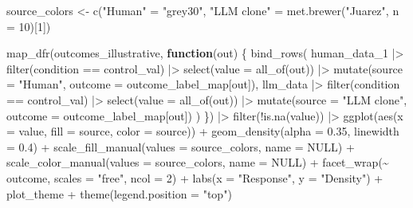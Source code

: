 \documentclass[
  letterpaper,
  DIV=11,
  numbers=noendperiod]{scrartcl}
\newenvironment{Shaded}{\begin{snugshade}}{\end{snugshade}}
\newcommand{\AttributeTok}[1]{\textcolor[rgb]{0.40,0.45,0.13}{#1}}
\newcommand{\ConstantTok}[1]{\textcolor[rgb]{0.56,0.35,0.01}{#1}}
\newcommand{\ControlFlowTok}[1]{\textcolor[rgb]{0.00,0.23,0.31}{\textbf{#1}}}
\newcommand{\DecValTok}[1]{\textcolor[rgb]{0.68,0.00,0.00}{#1}}
\newcommand{\FloatTok}[1]{\textcolor[rgb]{0.68,0.00,0.00}{#1}}
\newcommand{\FunctionTok}[1]{\textcolor[rgb]{0.28,0.35,0.67}{#1}}
\newcommand{\NormalTok}[1]{\textcolor[rgb]{0.00,0.23,0.31}{#1}}
\newcommand{\OtherTok}[1]{\textcolor[rgb]{0.00,0.23,0.31}{#1}}
\newcommand{\SpecialCharTok}[1]{\textcolor[rgb]{0.37,0.37,0.37}{#1}}
\newcommand{\StringTok}[1]{\textcolor[rgb]{0.13,0.47,0.30}{#1}}
\begin{document}
\begin{Shaded}
\begin{Highlighting}[]
\NormalTok{source\_colors }\OtherTok{\textless{}{-}} \FunctionTok{c}\NormalTok{(}\StringTok{"Human"} \OtherTok{=} \StringTok{"grey30"}\NormalTok{, }\StringTok{"LLM clone"} \OtherTok{=} \FunctionTok{met.brewer}\NormalTok{(}\StringTok{"Juarez"}\NormalTok{, }\AttributeTok{n =} \DecValTok{10}\NormalTok{)[}\DecValTok{1}\NormalTok{])}

\FunctionTok{map\_dfr}\NormalTok{(outcomes\_illustrative, }\ControlFlowTok{function}\NormalTok{(out) \{}
  \FunctionTok{bind\_rows}\NormalTok{(}
\NormalTok{    human\_data\_1 }\SpecialCharTok{|\textgreater{}} \FunctionTok{filter}\NormalTok{(condition }\SpecialCharTok{==}\NormalTok{ control\_val) }\SpecialCharTok{|\textgreater{}}
      \FunctionTok{select}\NormalTok{(}\AttributeTok{value =} \FunctionTok{all\_of}\NormalTok{(out)) }\SpecialCharTok{|\textgreater{}}
      \FunctionTok{mutate}\NormalTok{(}\AttributeTok{source =} \StringTok{"Human"}\NormalTok{,     }\AttributeTok{outcome =}\NormalTok{ outcome\_label\_map[out]),}
\NormalTok{    llm\_data   }\SpecialCharTok{|\textgreater{}} \FunctionTok{filter}\NormalTok{(condition }\SpecialCharTok{==}\NormalTok{ control\_val) }\SpecialCharTok{|\textgreater{}}
      \FunctionTok{select}\NormalTok{(}\AttributeTok{value =} \FunctionTok{all\_of}\NormalTok{(out)) }\SpecialCharTok{|\textgreater{}}
      \FunctionTok{mutate}\NormalTok{(}\AttributeTok{source =} \StringTok{"LLM clone"}\NormalTok{, }\AttributeTok{outcome =}\NormalTok{ outcome\_label\_map[out])}
\NormalTok{  )}
\NormalTok{\}) }\SpecialCharTok{|\textgreater{}}
  \FunctionTok{filter}\NormalTok{(}\SpecialCharTok{!}\FunctionTok{is.na}\NormalTok{(value)) }\SpecialCharTok{|\textgreater{}}
  \FunctionTok{ggplot}\NormalTok{(}\FunctionTok{aes}\NormalTok{(}\AttributeTok{x =}\NormalTok{ value, }\AttributeTok{fill =}\NormalTok{ source, }\AttributeTok{color =}\NormalTok{ source)) }\SpecialCharTok{+}
  \FunctionTok{geom\_density}\NormalTok{(}\AttributeTok{alpha =} \FloatTok{0.35}\NormalTok{, }\AttributeTok{linewidth =} \FloatTok{0.4}\NormalTok{) }\SpecialCharTok{+}
  \FunctionTok{scale\_fill\_manual}\NormalTok{(}\AttributeTok{values  =}\NormalTok{ source\_colors, }\AttributeTok{name =} \ConstantTok{NULL}\NormalTok{) }\SpecialCharTok{+}
  \FunctionTok{scale\_color\_manual}\NormalTok{(}\AttributeTok{values =}\NormalTok{ source\_colors, }\AttributeTok{name =} \ConstantTok{NULL}\NormalTok{) }\SpecialCharTok{+}
  \FunctionTok{facet\_wrap}\NormalTok{(}\SpecialCharTok{\textasciitilde{}}\NormalTok{ outcome, }\AttributeTok{scales =} \StringTok{"free"}\NormalTok{, }\AttributeTok{ncol =} \DecValTok{2}\NormalTok{) }\SpecialCharTok{+}
  \FunctionTok{labs}\NormalTok{(}\AttributeTok{x =} \StringTok{"Response"}\NormalTok{, }\AttributeTok{y =} \StringTok{"Density"}\NormalTok{) }\SpecialCharTok{+}
\NormalTok{  plot\_theme }\SpecialCharTok{+}
  \FunctionTok{theme}\NormalTok{(}\AttributeTok{legend.position =} \StringTok{"top"}\NormalTok{)}
\end{Highlighting}
\end{Shaded}
\end{document}
